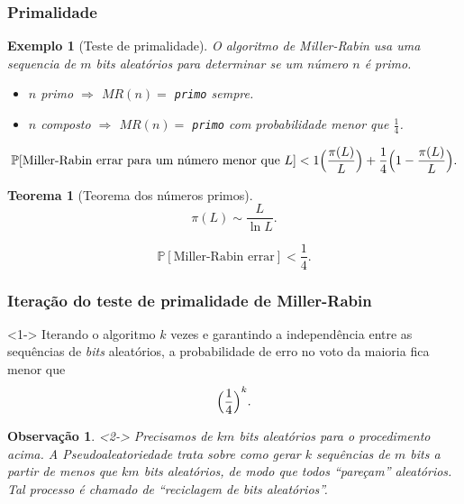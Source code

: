 \documentclass{beamer}
\def\Prob{\mathbb{P}} %
\def\MMp{\mathrm{.}} %
\theoremstyle{teoaxicorlem}
\newtheorem{Teo}{Teorema}
\theoremstyle{defnotnom}
\newtheorem{Ex}{Exemplo}
\newtheorem{Obs}{Observação}
\begin{document}
\begin{frame}
  \frametitle{Primalidade}
  \footnotesize
  \begin{Ex}[Teste de primalidade]
    O algoritmo de Miller-Rabin usa uma sequencia de $m$
    \textit{bits}
    aleatórios para determinar se um número $n$ é primo.
    \begin{itemize}
    \item $n$ primo $\Longrightarrow$ $MR(n)=$ \texttt{primo} sempre.
    \item $n$ composto $\Longrightarrow$ $MR(n)=$ \texttt{primo} com
      probabilidade menor que $\frac14$.
    \end{itemize}
  \end{Ex}
  \pause\vfill
  \begin{equation*}
    \Prob[\text{Miller-Rabin errar para um número menor que $L$}] <
    1\Bigl(\frac{\pi(L)}{L}\Bigr) +
    \frac14\Bigl(1-\frac{\pi(L)}{L}\Bigr)\MMp
  \end{equation*}
  \pause\vfill
  \begin{Teo}[Teorema dos números primos]
    \begin{equation*}
      \pi(L)\sim \textstyle\frac{L}{\ln L}\MMp
    \end{equation*}
  \end{Teo}
  \pause\vfill
  \begin{equation*}
    \Prob[\text{Miller-Rabin errar}] < \frac14\MMp
  \end{equation*}
\end{frame}

\begin{frame}
  \frametitle{Iteração do teste de primalidade de Miller-Rabin}
  \begin{block}<1->{}
    Iterando o algoritmo $k$ vezes e garantindo
    a independência entre as sequências de \textit{bits}
    aleatórios, a
    probabilidade de erro no voto da maioria fica menor que
    \begin{equation*}
      {\Bigl(\frac14\Bigr)}^k\MMp
    \end{equation*}
  \end{block}
  \vfill
  \begin{Obs}<2->
    Precisamos de $km$ \textit{bits}
    aleatórios para o procedimento acima. A \alert{Pseudoaleatoriedade}
    trata sobre como gerar $k$ sequências de $m$ \textit{bits} a partir
    de menos que $km$ \textit{bits} aleatórios, de modo que todos
    ``pareçam'' aleatórios. Tal processo é chamado de
    \alert{``reciclagem de
    \textit{bits} aleatórios''}.
  \end{Obs}
\end{frame}
\end{document}
